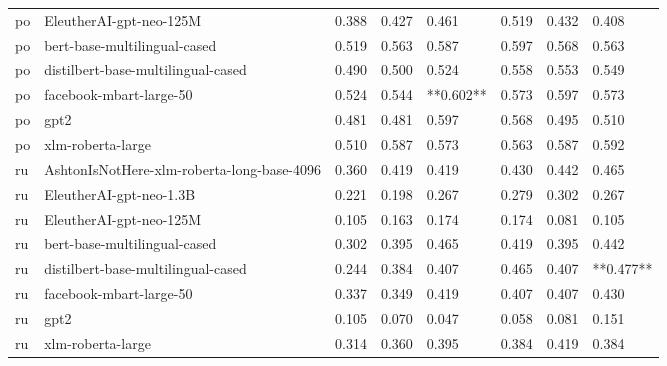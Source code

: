 \begin{tabular}{llllllll}
      po &                    EleutherAI-gpt-neo-125M & 0.388 &                     0.427 &                 0.461 &                  0.519 &                                   0.432 &     0.408 \\
      po &               bert-base-multilingual-cased & 0.519 &                     0.563 &                 0.587 &                  0.597 &                                   0.568 &     0.563 \\
      po &         distilbert-base-multilingual-cased & 0.490 &                     0.500 &                 0.524 &                  0.558 &                                   0.553 &     0.549 \\
      po &                    facebook-mbart-large-50 & 0.524 &                     0.544 &             **0.602** &                  0.573 &                                   0.597 &     0.573 \\
      po &                                       gpt2 & 0.481 &                     0.481 &                 0.597 &                  0.568 &                                   0.495 &     0.510 \\
      po &                          xlm-roberta-large & 0.510 &                     0.587 &                 0.573 &                  0.563 &                                   0.587 &     0.592 \\
      ru & AshtonIsNotHere-xlm-roberta-long-base-4096 & 0.360 &                     0.419 &                 0.419 &                  0.430 &                                   0.442 &     0.465 \\
      ru &                    EleutherAI-gpt-neo-1.3B & 0.221 &                     0.198 &                 0.267 &                  0.279 &                                   0.302 &     0.267 \\
      ru &                    EleutherAI-gpt-neo-125M & 0.105 &                     0.163 &                 0.174 &                  0.174 &                                   0.081 &     0.105 \\
      ru &               bert-base-multilingual-cased & 0.302 &                     0.395 &                 0.465 &                  0.419 &                                   0.395 &     0.442 \\
      ru &         distilbert-base-multilingual-cased & 0.244 &                     0.384 &                 0.407 &                  0.465 &                                   0.407 & **0.477** \\
      ru &                    facebook-mbart-large-50 & 0.337 &                     0.349 &                 0.419 &                  0.407 &                                   0.407 &     0.430 \\
      ru &                                       gpt2 & 0.105 &                     0.070 &                 0.047 &                  0.058 &                                   0.081 &     0.151 \\
      ru &                          xlm-roberta-large & 0.314 &                     0.360 &                 0.395 &                  0.384 &                                   0.419 &     0.384 \\
\bottomrule
\end{tabular}
